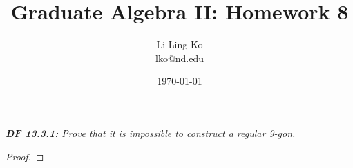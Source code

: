 \documentclass{article}
\begin{document}
\title{Graduate Algebra II: Homework 8}
\author{Li Ling Ko\\ lko@nd.edu}
\date{\today}
\maketitle

\it \textbf{DF 13.3.1:} Prove that it is impossible to construct a regular
  9-gon.

  \begin{proof}
  \end{proof}
\end{document}
